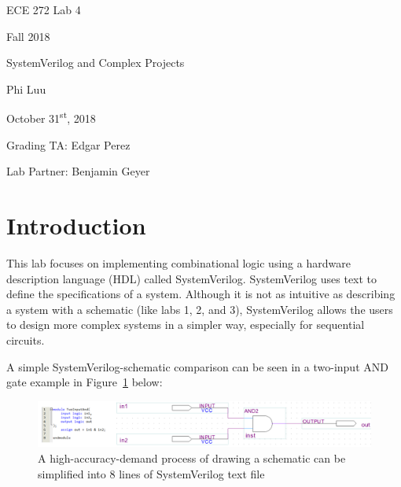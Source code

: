 \documentclass[12pt]{article}
\begin{document}
\begin{titlepage}
  \begin{center} \LARGE
    \vspace*{1.5in}

    ECE 272 Lab 4

    Fall 2018

    \vfill

    SystemVerilog and Complex Projects

    Phi Luu

    \vfill

    October 31\textsuperscript{st}, 2018

    Grading TA: Edgar Perez

    Lab Partner: Benjamin Geyer

    \vspace{1.5in}
  \end{center}
\end{titlepage}

\section{Introduction}

This lab focuses on implementing combinational logic using a hardware description language (HDL) called SystemVerilog. SystemVerilog uses text to define the specifications of a system. Although it is not as intuitive as describing a system with a schematic (like labs 1, 2, and 3), SystemVerilog allows the users to design more complex systems in a simpler way, especially for sequential circuits.

A simple SystemVerilog-schematic comparison can be seen in a two-input AND gate example in Figure~\ref{figure:1} below:

\begin{figure}[ht]
  \centering
  \includegraphics[width=\textwidth]{systemverilog_schematic_comparison.png}
  \caption{A high-accuracy-demand process of drawing a schematic can be simplified into 8 lines of SystemVerilog text file}
  \label{figure:1}
\end{figure}
\end{document}
